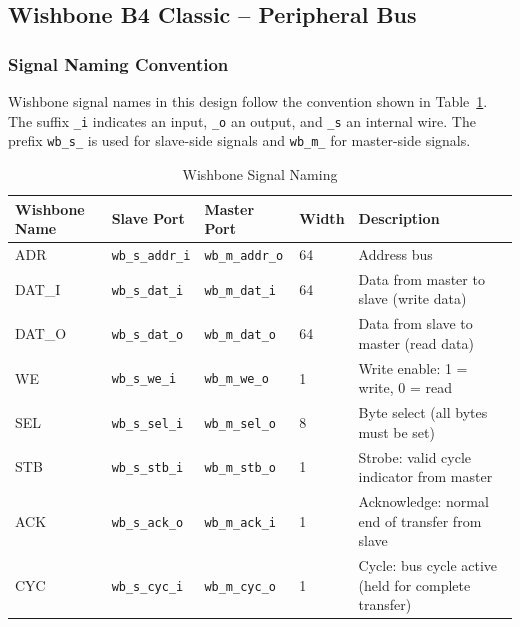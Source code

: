 \subsection{Wishbone B4 Classic -- Peripheral Bus}

\subsubsection{Signal Naming Convention}

Wishbone signal names in this design follow the convention shown in
Table~\ref{tab:asBusConcept02}.
The suffix \texttt{\_i} indicates an input, \texttt{\_o} an output,
and \texttt{\_s} an internal wire.
The prefix \texttt{wb\_s\_} is used for slave-side signals and
\texttt{wb\_m\_} for master-side signals.

\begin{table}[H]
\caption{Wishbone Signal Naming}
\label{tab:asBusConcept02}
\centering
\begin{tabularx}{\textwidth}{|l |l |l |l |X|}
  \hline
  Wishbone Name & Slave Port & Master Port & Width & Description \\
  \hline
  \hline
  ADR    & \texttt{wb\_s\_addr\_i} & \texttt{wb\_m\_addr\_o} & 64 & Address bus \\
  \hline
  DAT\_I & \texttt{wb\_s\_dat\_i}  & \texttt{wb\_m\_dat\_i}  & 64 & Data from master to slave (write data) \\
  \hline
  DAT\_O & \texttt{wb\_s\_dat\_o}  & \texttt{wb\_m\_dat\_o}  & 64 & Data from slave to master (read data) \\
  \hline
  WE     & \texttt{wb\_s\_we\_i}   & \texttt{wb\_m\_we\_o}   & 1  & Write enable: 1 = write, 0 = read \\
  \hline
  SEL    & \texttt{wb\_s\_sel\_i}  & \texttt{wb\_m\_sel\_o}  & 8  & Byte select (all bytes must be set) \\
  \hline
  STB    & \texttt{wb\_s\_stb\_i}  & \texttt{wb\_m\_stb\_o}  & 1  & Strobe: valid cycle indicator from master \\
  \hline
  ACK    & \texttt{wb\_s\_ack\_o}  & \texttt{wb\_m\_ack\_i}  & 1  & Acknowledge: normal end of transfer from slave \\
  \hline
  CYC    & \texttt{wb\_s\_cyc\_i}  & \texttt{wb\_m\_cyc\_o}  & 1  & Cycle: bus cycle active (held for complete transfer) \\
  \hline
\end{tabularx}
\end{table}

